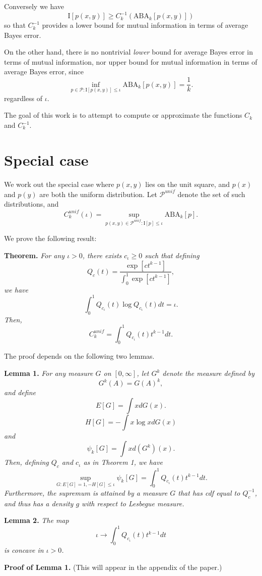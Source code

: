 \documentclass[12pt]{article}
\begin{document}
Conversely we have
\[
\text{I}[p(x,y)] \geq C^{-1}_k(\text{ABA}_k[p(x,y)])
\]
so that $C^{-1}_k$ provides a lower bound for mutual information in terms of average Bayes error.

On the other hand, there is no nontrivial \emph{lower} bound for average Bayes error in terms of mutual information,
nor upper bound for mutual information in terms of average Bayes error, since
\[
\inf_{p \in \mathcal{P}: \text{I}[p(x,y)] \leq \iota} \text{ABA}_k[p(x,y)] = \frac{1}{k}.
\]
regardless of $\iota$.

The goal of this work is to attempt to compute or approximate the functions $C_k$ and $C_k^{-1}$.

\section{Special case}

We work out the special case where $p(x,y)$ lies on the unit square, and $p(x)$ and $p(y)$ are both the uniform distribution.
Let $\mathcal{P}^{unif}$ denote the set of such distributions, and 
\[
C_k^{unif}(\iota) = \sup_{p(x, y) \in \mathcal{P}^{unif}: \text{I}[p] \leq \iota} \text{ABA}_k[p]. 
\]

We prove the following result:

\textbf{Theorem.} \emph{
For any $\iota > 0$, there exists $c_\iota \geq 0$ such that defining
\[
Q_c(t) = \frac{\exp[ct^{k-1}]}{\int_0^1 \exp[ct^{k-1}]},
\]
we have
\[
\int_0^1 Q_{c_\iota}(t) \log Q_{c_\iota}(t) dt = \iota.
\]
Then,
\[
C_k^{unif} = \int_0^1 Q_{c_\iota}(t) t^{k-1} dt.
\]
}

The proof depends on the following two lemmas.

\textbf{Lemma 1.} \emph{
For any measure $G$ on $[0, \infty]$,
let $G^k$ denote the measure defined by
\[
G^k(A) = G(A)^k,
\]
and define
\[
E[G] = \int x dG(x).
\]
\[
H[G] = -\int x \log x dG(x)
\]
and
\[
\psi_k[G] = \int x d(G^k)(x).
\]
Then, defining $Q_c$ and $c_\iota$ as in Theorem 1, we have
\[
\sup_{G: E[G] = 1, -H[G] \leq \iota} \psi_k[G] = \int_0^1 Q_{c_\iota}(t) t^{k-1} dt.
\]
Furthermore, the supremum is attained by a measure $G$ that has cdf
equal to $Q_c^{-1}$, and thus has a density $g$ with respect to
Lesbegue measure.  }

\textbf{Lemma 2.} \emph{
The map
\[
\iota \to \int_0^1 Q_{c_\iota}(t) t^{k-1} dt
\]
is concave in $\iota > 0$.
}

\textbf{Proof of Lemma 1.} (This will appear in the appendix of the paper.)
\end{document}
